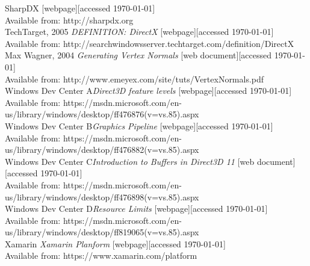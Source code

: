 \documentclass[twoside, english, 11pt]{report}
\begin{document}
\small SharpDX [webpage][accessed \today] \\
Available from: http://sharpdx.org\\

\small TechTarget, 2005 \textit{DEFINITION: DirectX} [webpage][accessed \today] \\
Available from: http://searchwindowsserver.techtarget.com/definition/DirectX\\

\small Max Wagner, 2004 \textit{Generating Vertex Normals} [web document][accessed \today] \\
Available from: http://www.emeyex.com/site/tuts/VertexNormals.pdf\\

\small Windows Dev Center A\textit{Direct3D feature levels} [webpage][accessed \today] \\
Available from: https://msdn.microsoft.com/en-us/library/windows/desktop/ff476876(v=vs.85).aspx\\

\small Windows Dev Center B\textit{Graphics Pipeline} [webpage][accessed \today] \\
Available from: https://msdn.microsoft.com/en-us/library/windows/desktop/ff476882(v=vs.85).aspx\\

\small Windows Dev Center C\textit{Introduction to Buffers in Direct3D 11} [web document][accessed \today] \\
Available from: https://msdn.microsoft.com/en-us/library/windows/desktop/ff476898(v=vs.85).aspx\\

\small Windows Dev Center D\textit{Resource Limits } [webpage][accessed \today] \\
Available from: https://msdn.microsoft.com/en-us/library/windows/desktop/ff819065(v=vs.85).aspx\\

\small Xamarin \textit{Xamarin Planform} [webpage][accessed \today] \\
Available from: https://www.xamarin.com/platform\\
\end{document}
